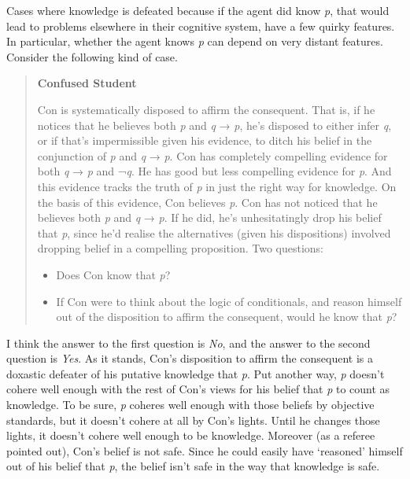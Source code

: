 \documentclass[
  11pt,
  letterpaper,
  DIV=11,
  numbers=noendperiod,
  twoside]{scrartcl}
\begin{document}
Cases where knowledge is defeated because if the agent did know
\emph{p}, that would lead to problems elsewhere in their cognitive
system, have a few quirky features. In particular, whether the agent
knows \emph{p} can depend on very distant features. Consider the
following kind of case.

\begin{quote}
\textbf{Confused Student}

Con is systematically disposed to affirm the consequent. That is, if he
notices that he believes both \emph{p} and \emph{q} → \emph{p}, he's
disposed to either infer \emph{q}, or if that's impermissible given his
evidence, to ditch his belief in the conjunction of \emph{p} and
\emph{q} → \emph{p}. Con has completely compelling evidence for both
\emph{q} → \emph{p} and ¬\emph{q}. He has good but less compelling
evidence for \emph{p}. And this evidence tracks the truth of \emph{p} in
just the right way for knowledge. On the basis of this evidence, Con
believes \emph{p}. Con has not noticed that he believes both \emph{p}
and \emph{q} → \emph{p}. If he did, he's unhesitatingly drop his belief
that \emph{p}, since he'd realise the alternatives (given his
dispositions) involved dropping belief in a compelling proposition. Two
questions:

\begin{itemize}
\item
  Does Con know that \emph{p}?
\item
  If Con were to think about the logic of conditionals, and reason
  himself out of the disposition to affirm the consequent, would he know
  that \emph{p}?
\end{itemize}
\end{quote}

I think the answer to the first question is \emph{No}, and the answer to
the second question is \emph{Yes}. As it stands, Con's disposition to
affirm the consequent is a doxastic defeater of his putative knowledge
that \emph{p}. Put another way, \emph{p} doesn't cohere well enough with
the rest of Con's views for his belief that \emph{p} to count as
knowledge. To be sure, \emph{p} coheres well enough with those beliefs
by objective standards, but it doesn't cohere at all by Con's lights.
Until he changes those lights, it doesn't cohere well enough to be
knowledge. Moreover (as a referee pointed out), Con's belief is not
safe. Since he could easily have `reasoned' himself out of his belief
that \emph{p}, the belief isn't safe in the way that knowledge is safe.
\end{document}
